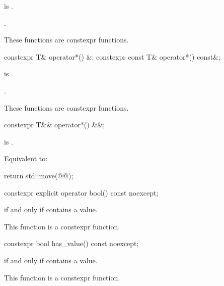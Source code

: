 \begin{itemdescr}
\pnum
\hardexpects
{} is .

\pnum
\returns
{}.

\pnum
\remarks
These functions are constexpr functions.
\end{itemdescr}

%
\begin{itemdecl}
constexpr T& operator*() &;
constexpr const T& operator*() const&;
\end{itemdecl}

\begin{itemdescr}
\pnum
\hardexpects
{} is .

\pnum
\returns
{}.

\pnum
\remarks
These functions are constexpr functions.
\end{itemdescr}

%
\begin{itemdecl}
constexpr T&& operator*() &&;
\end{itemdecl}

\begin{itemdescr}
\pnum
\hardexpects
{} is .

\pnum
\effects
Equivalent to:
\begin{codeblock}
return std::move(@@);
\end{codeblock}
\end{itemdescr}

%
\begin{itemdecl}
constexpr explicit operator bool() const noexcept;
\end{itemdecl}

\begin{itemdescr}
\pnum
\returns
{} if and only if  contains a value.

\pnum
\remarks
This function is a constexpr function.
\end{itemdescr}

%
\begin{itemdecl}
constexpr bool has_value() const noexcept;
\end{itemdecl}

\begin{itemdescr}
\pnum
\returns
{} if and only if  contains a value.

\pnum
\remarks
This function is a constexpr function.
\end{itemdescr}

